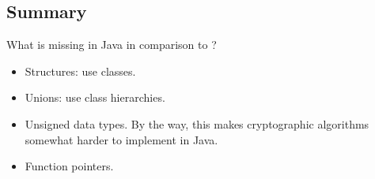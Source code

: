\subsection{Summary}

What is missing in Java in comparison to \CCpp?


\begin{itemize}
\item Structures: use classes.

\item Unions: use class hierarchies.

\item Unsigned data types.
By the way, this makes cryptographic algorithms somewhat harder to implement in Java.


\item Function pointers.
\end{itemize}
